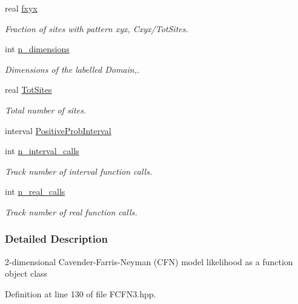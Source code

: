\begin{DoxyCompactItemize}
real \hyperlink{classFCFN3Rooted_a3a97b7a6f1ba450e0bb32968091549b9}{fxyx}
\begin{DoxyCompactList}\small\item\em \-Fraction of sites with pattern xyx, \-Cxyx/\-Tot\-Sites. \end{DoxyCompactList}\item 
int \hyperlink{classFCFN3Rooted_af84f68c176afe037f53b5e771fdaca10}{n\-\_\-dimensions}
\begin{DoxyCompactList}\small\item\em \-Dimensions of the labelled \-Domain,. \end{DoxyCompactList}\item 
real \hyperlink{classFCFN3Rooted_ac071065bf14d9a7db421bff6e0d05db7}{\-Tot\-Sites}
\begin{DoxyCompactList}\small\item\em \-Total number of sites. \end{DoxyCompactList}\item 
interval \hyperlink{classFCFN3Rooted_a94e06be93e45993db4f67855642b6d0a}{\-Positive\-Prob\-Interval}
\item 
int \hyperlink{classFCFN3Rooted_a8aab095c503c3cc6f1c3b5a8571dac7b}{n\-\_\-interval\-\_\-calls}
\begin{DoxyCompactList}\small\item\em \-Track number of interval function calls. \end{DoxyCompactList}\item 
int \hyperlink{classFCFN3Rooted_a27353da51f2f301e3fc59578f0ce1dbb}{n\-\_\-real\-\_\-calls}
\begin{DoxyCompactList}\small\item\em \-Track number of real function calls. \end{DoxyCompactList}\end{DoxyCompactItemize}


\subsubsection{\-Detailed \-Description}
2-\/dimensional \-Cavender-\/\-Farris-\/\-Neyman (\-C\-F\-N) model likelihood as a function object class 

\-Definition at line 130 of file \-F\-C\-F\-N3.\-hpp.



